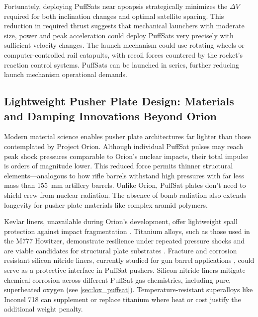 \documentclass{article}
\begin{document}
{Fortunately, deploying PuffSats near apoapsis strategically minimizes the $\Delta V$ required for both inclination changes and optimal satellite spacing. This reduction in required thrust suggests that mechanical launchers with moderate size, power and peak acceleration could deploy PuffSats very precisely with sufficient velocity changes.  The launch mechanism could use rotating wheels or computer-controlled rail catapults, with recoil forces countered by the rocket's reaction control systems. PuffSats can be launched in series, further reducing launch mechanism operational demands.

\subsection{Lightweight Pusher Plate Design: Materials and Damping Innovations Beyond Orion}\label{sec:lightweight_pusher_plates}
Modern material science enables pusher plate architectures far lighter than those contemplated by Project Orion. Although individual PuffSat pulses may reach peak shock pressures comparable to Orion’s nuclear impacts, their total impulse is orders of magnitude lower. This reduced force permits thinner structural elements—analogous to how rifle barrels withstand high pressures with far less mass than \SI{155}{\milli\meter} artillery barrels. Unlike Orion, PuffSat plates don't need to shield crew from nuclear radiation.  The absence of bomb radiation also extends longevity for pusher plate materials like complex aramid polymers.

Kevlar liners, unavailable during Orion’s development, offer lightweight spall protection against impact fragmentation \cite{spall_liners}. Titanium alloys, such as those used in the M777 Howitzer, demonstrate resilience under repeated pressure shocks and are viable candidates for structural plate substrates \cite{titanium_m777}. Fracture and corrosion resistant silicon nitride liners, currently studied for gun barrel applications \cite{silicon_nitride_gun}, could serve as a protective interface in PuffSat pushers.  Silicon nitride liners mitigate chemical corrosion across different PuffSat gas chemistries, including pure, superheated oxygen (see \autoref{sec:lox_puffsat}).  Temperature-resistant superalloys like Inconel 718 \cite{inconel_718_strong} can supplement or replace titanium where heat or cost justify the additional weight penalty.

}
\end{document}

